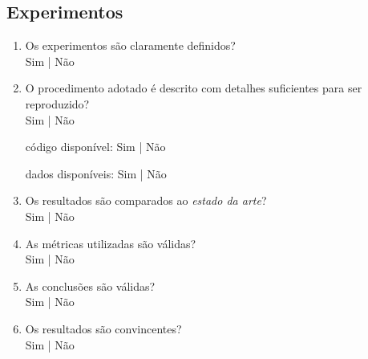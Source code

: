 \documentclass{UnBExam}%
\begin{document}
    \subsection{Experimentos}%
    \begin{enumerate}
        \item Os experimentos são claramente definidos?\\%
        Sim | Não

        \item O procedimento adotado é descrito com detalhes suficientes para
        ser reproduzido?\\%
        Sim | Não%
        \hfill\begin{minipage}{.29\textwidth}%

        \hfill código disponível: Sim | Não%

        \hfill dados disponíveis: Sim | Não%
        \end{minipage}%

        \item Os resultados são comparados ao \emph{estado da arte}?\\%
        Sim | Não

        \item As métricas utilizadas são válidas?\\%
        Sim | Não

        \item As conclusões são válidas?\\%
        Sim | Não

        \item Os resultados são convincentes?\\%
        Sim | Não
    \end{enumerate}%
\end{document}
